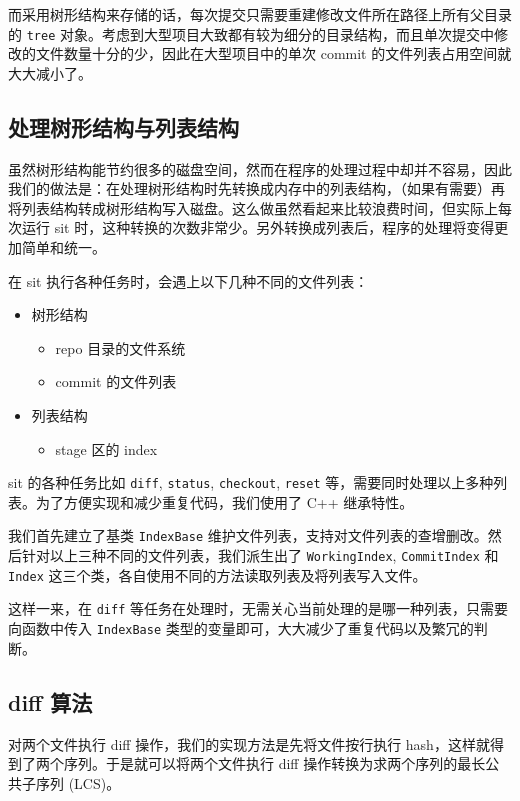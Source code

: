 而采用树形结构来存储的话，每次提交只需要重建修改文件所在路径上所有父目录的
\texttt{tree}
对象。考虑到大型项目大致都有较为细分的目录结构，而且单次提交中修改的文件数量十分的少，因此在大型项目中的单次
commit 的文件列表占用空间就大大减小了。

\subsection{处理树形结构与列表结构}

虽然树形结构能节约很多的磁盘空间，然而在程序的处理过程中却并不容易，因此我们的做法是：在处理树形结构时先转换成内存中的列表结构，（如果有需要）再将列表结构转成树形结构写入磁盘。这么做虽然看起来比较浪费时间，但实际上每次运行
sit
时，这种转换的次数非常少。另外转换成列表后，程序的处理将变得更加简单和统一。

在 sit 执行各种任务时，会遇上以下几种不同的文件列表：

\begin{itemize}
	\item 树形结构
  	\begin{itemize}
		\item repo 目录的文件系统
		\item commit 的文件列表
	\end{itemize}
	\item 列表结构
	\begin{itemize}
		\item stage 区的 index
	\end{itemize}
\end{itemize}

sit 的各种任务比如 \texttt{diff}, \texttt{status}, \texttt{checkout},
\texttt{reset}
等，需要同时处理以上多种列表。为了方便实现和减少重复代码，我们使用了 C++
继承特性。

我们首先建立了基类 \texttt{IndexBase}
维护文件列表，支持对文件列表的查增删改。然后针对以上三种不同的文件列表，我们派生出了
\texttt{WorkingIndex}, \texttt{CommitIndex} 和 \texttt{Index}
这三个类，各自使用不同的方法读取列表及将列表写入文件。

这样一来，在 \texttt{diff}
等任务在处理时，无需关心当前处理的是哪一种列表，只需要向函数中传入
\texttt{IndexBase} 类型的变量即可，大大减少了重复代码以及繁冗的判断。

\subsection{diff 算法}

对两个文件执行 diff 操作，我们的实现方法是先将文件按行执行
hash，这样就得到了两个序列。于是就可以将两个文件执行 diff
操作转换为求两个序列的最长公共子序列 (LCS)。

